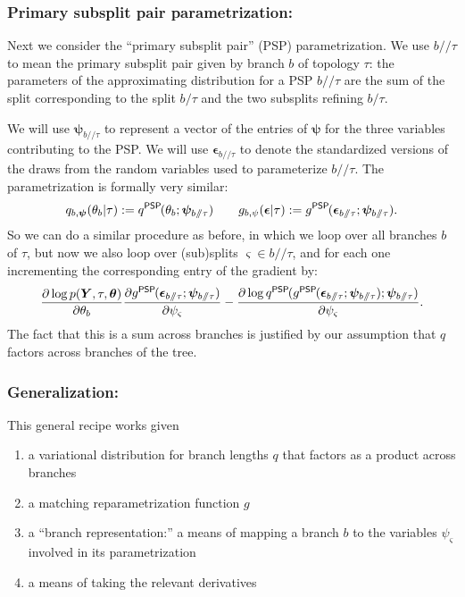 \documentclass{article}
\newcommand{\psp}{\slash\!\!\slash}
\newcommand{\qPSP}{q^\textsf{PSP}\hspace{-1pt}}
\newcommand{\gPSP}{g^\textsf{PSP}\hspace{-1pt}}
\begin{document}
\subsubsection*{Primary subsplit pair parametrization:}
Next we consider the ``primary subsplit pair'' (PSP) parametrization.
We use $b \psp \tau$ to mean the primary subsplit pair given by branch $b$ of topology $\tau$: the parameters of the approximating distribution for a PSP $b \psp \tau$ are the sum of the split corresponding to the split $b \slash \tau$ and the two subsplits refining $b \slash \tau$.

We will use $\bm\psi_{b \psp \tau}$ to represent a vector of the entries of $\bm\psi$ for the three variables contributing to the PSP.
We will use $\bm\epsilon_{b \psp \tau}$ to denote the standardized versions of the draws from the random variables used to parameterize $b \psp \tau$.
The parametrization is formally very similar:
\[
q_{b, \bm{\psi}}(\theta_b | \tau) := \qPSP(\theta_b; \bm\psi_{b \psp \tau})
\qquad
g_{b,\psi}(\bm\epsilon | \tau) := \gPSP(\bm\epsilon_{b \psp \tau}; \bm\psi_{b \psp \tau}).
\]
So we can do a similar procedure as before, in which we loop over all branches $b$ of $\tau$, but now we also loop over (sub)splits $\varsigma \in b \psp \tau$, and for each one incrementing the corresponding entry of the gradient by:
\begin{equation}
    \frac{\partial \log p(\bm{Y}, \tau, \bm\theta)}{\partial \theta_b}
    \frac{\partial \gPSP(\bm\epsilon_{b \psp \tau}; \bm\psi_{b \psp \tau})}{\partial \psi_{\varsigma}}
    - \frac{\partial \log \qPSP(\gPSP(\bm\epsilon_{b \psp \tau}; \bm\psi_{b \psp \tau}); \bm\psi_{b \psp \tau})}{\partial \psi_{\varsigma}}.
    \label{eq:PSPgradComponent}
\end{equation}
The fact that this is a sum across branches is justified by our assumption that $q$ factors across branches of the tree.

\subsubsection*{Generalization:}
This general recipe works given
\begin{enumerate}
    \item a variational distribution for branch lengths $q$ that factors as a product across branches
    \item a matching reparametrization function $g$
    \item a ``branch representation:'' a means of mapping a branch $b$ to the variables $\psi_\varsigma$ involved in its parametrization
    \item a means of taking the relevant derivatives
\end{enumerate}
\end{document}
